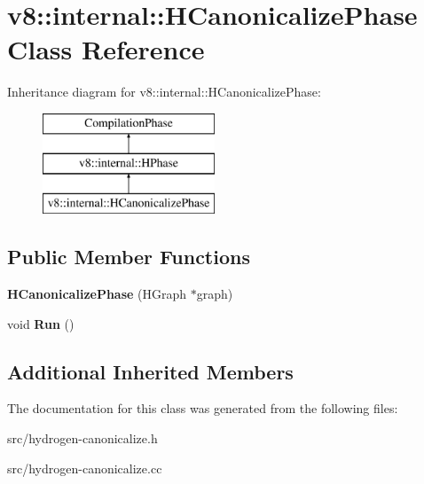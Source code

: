 \hypertarget{classv8_1_1internal_1_1_h_canonicalize_phase}{}\section{v8\+:\+:internal\+:\+:H\+Canonicalize\+Phase Class Reference}
\label{classv8_1_1internal_1_1_h_canonicalize_phase}
Inheritance diagram for v8\+:\+:internal\+:\+:H\+Canonicalize\+Phase\+:\begin{figure}[H]
\begin{center}
\leavevmode
\includegraphics[height=3.000000cm]{classv8_1_1internal_1_1_h_canonicalize_phase}
\end{center}
\end{figure}
\subsection*{Public Member Functions}
\begin{DoxyCompactItemize}
\item 
\hypertarget{classv8_1_1internal_1_1_h_canonicalize_phase_abdb64d64a05df04d5956d46668f59154}{}{\bfseries H\+Canonicalize\+Phase} (H\+Graph $\ast$graph)\label{classv8_1_1internal_1_1_h_canonicalize_phase_abdb64d64a05df04d5956d46668f59154}

\item 
\hypertarget{classv8_1_1internal_1_1_h_canonicalize_phase_a6feb1f0187b5fdd92f59375bca9ce920}{}void {\bfseries Run} ()\label{classv8_1_1internal_1_1_h_canonicalize_phase_a6feb1f0187b5fdd92f59375bca9ce920}

\end{DoxyCompactItemize}
\subsection*{Additional Inherited Members}


The documentation for this class was generated from the following files\+:\begin{DoxyCompactItemize}
\item 
src/hydrogen-\/canonicalize.\+h\item 
src/hydrogen-\/canonicalize.\+cc\end{DoxyCompactItemize}
